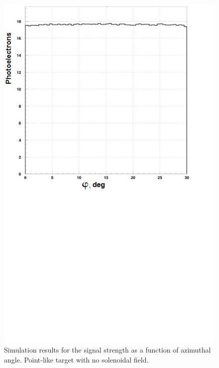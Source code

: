 \begin{figure}[!ht]
    \centering
    \includegraphics[width=1.0\linewidth,trim={0.0cm 9.4cm 0.0cm 0.0cm},clip]{images/Point_Targ_Zero_Field_Phi.jpg}
    \caption{Simulation results for the signal strength as a function of azimuthal angle. Point-like target with no
      solenoidal field.}
    \label{fig:Point_Targ_Zero_Field_Phi}
\end{figure}

